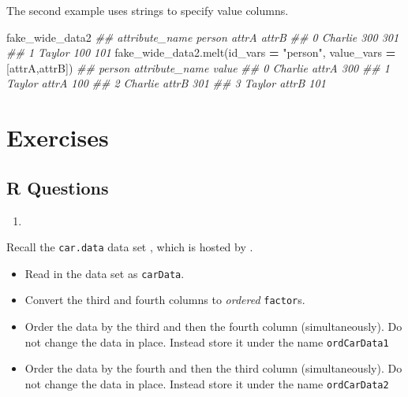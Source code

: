 \documentclass[
  12pt,
  krantz2]{krantz}
\makeatletter
\newenvironment{Shaded}{\begin{snugshade}}{\end{snugshade}}
\newcommand{\CommentTok}[1]{\textcolor[rgb]{0.37,0.37,0.37}{\textit{#1}}}
\newcommand{\NormalTok}[1]{#1}
\newcommand{\OperatorTok}[1]{\textcolor[rgb]{0.43,0.43,0.43}{\textbf{#1}}}
\newcommand{\StringTok}[1]{\textcolor[rgb]{0.5,0.5,0.5}{#1}}
\providecommand{\tightlist}{%
  \setlength{\itemsep}{0pt}\setlength{\parskip}{0pt}}
\newenvironment{kframe}{%
\medskip{}
\setlength{\fboxsep}{.8em}
 \def\at@end@of@kframe{}%
 \ifinner\ifhmode%
  \def\at@end@of@kframe{\end{minipage}}%
  \begin{minipage}{\columnwidth}%
 \fi\fi%
 \def\FrameCommand##1{\hskip\@totalleftmargin \hskip-\fboxsep
 \colorbox{shadecolor}{##1}\hskip-\fboxsep
     \hskip-\linewidth \hskip-\@totalleftmargin \hskip\columnwidth}%
 \MakeFramed {\advance\hsize-\width
   \@totalleftmargin\z@ \linewidth\hsize
   \@setminipage}}%
 {\par\unskip\endMakeFramed%
 \at@end@of@kframe}
\renewenvironment{Shaded}{\begin{kframe}}{\end{kframe}}
\makeatother
\begin{document}
The second example uses strings to specify value columns.

\begin{Shaded}
\begin{Highlighting}[]
\NormalTok{fake\_wide\_data2}
\CommentTok{\#\# attribute\_name   person  attrA  attrB}
\CommentTok{\#\# 0               Charlie    300    301}
\CommentTok{\#\# 1                Taylor    100    101}
\NormalTok{fake\_wide\_data2.melt(id\_vars }\OperatorTok{=} \StringTok{"person"}\NormalTok{, }
\NormalTok{                     value\_vars }\OperatorTok{=}\NormalTok{ [}\StringTok{\textquotesingle{}attrA\textquotesingle{}}\NormalTok{,}\StringTok{\textquotesingle{}attrB\textquotesingle{}}\NormalTok{])}
\CommentTok{\#\#     person attribute\_name  value}
\CommentTok{\#\# 0  Charlie          attrA    300}
\CommentTok{\#\# 1   Taylor          attrA    100}
\CommentTok{\#\# 2  Charlie          attrB    301}
\CommentTok{\#\# 3   Taylor          attrB    101}
\end{Highlighting}
\end{Shaded}

\hypertarget{exercises-10}{%
\section{Exercises}\label{exercises-10}}

\hypertarget{r-questions-9}{%
\subsection{R Questions}\label{r-questions-9}}

\begin{enumerate}
\def\labelenumi{\arabic{enumi}.}
\tightlist
\item
\end{enumerate}

Recall the \texttt{car.data} data set \citep{misc_car_evaluation_19}, which is hosted by \citep{uci_data}.

\begin{itemize}
\tightlist
\item
  Read in the data set as \texttt{carData}.
\item
  Convert the third and fourth columns to \emph{ordered} \texttt{factor}s.
\item
  Order the data by the third and then the fourth column (simultaneously). Do not change the data in place. Instead store it under the name \texttt{ordCarData1}
\item
  Order the data by the fourth and then the third column (simultaneously). Do not change the data in place. Instead store it under the name \texttt{ordCarData2}
\end{itemize}
\end{document}
